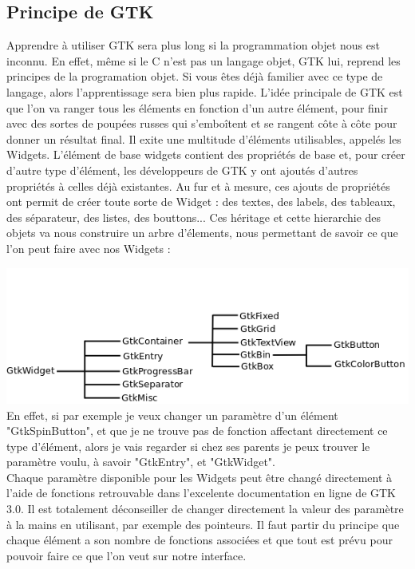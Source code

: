 \documentclass[11pt,french,a4paper]{report}
\begin{document}
        \subsection{Principe de GTK}
Apprendre à utiliser GTK sera plus long si la programmation objet nous est inconnu. En effet, même si le C n'est pas un langage objet, GTK lui, reprend 
les principes de la programation objet. Si vous êtes déjà familier avec ce type de langage, alors l'apprentissage sera bien plus rapide.  
L'idée principale de GTK est que l'on va ranger tous les éléments en fonction d'un autre élément, pour finir avec des sortes de poupées russes qui s'emboîtent 
et se rangent côte à côte pour donner un résultat final. Il exite une multitude d'éléments utilisables, appelés les Widgets. L'élément de base widgets contient des propriétés de 
base et, pour créer d'autre type d'élément, les développeurs de GTK y ont ajoutés d'autres propriétés à celles déjà existantes. 
Au fur et à mesure, ces ajouts de propriétés ont permit de créer toute sorte de Widget : des textes, des labels, des tableaux, des séparateur, des listes, des bouttons... 
Ces héritage et cette hierarchie des objets va nous construire un arbre d'élements, nous permettant de savoir ce que l'on peut faire avec nos Widgets : 

\includegraphics[scale=0.7]{../images/dia/arbo_widget.png} \\


En effet, si par exemple je veux changer un paramètre d'un élément "GtkSpinButton", et que je ne trouve pas de fonction affectant directement ce type d'élément, 
alors je vais regarder si chez ses parents je peux trouver le paramètre voulu, à savoir "GtkEntry", et "GtkWidget". \\

Chaque paramètre disponible pour les Widgets peut être changé directement à l'aide de fonctions retrouvable dans l'excelente documentation en ligne de GTK 3.0. 
Il est totalement déconseiller de changer directement la valeur des paramètre à la mains en utilisant, par exemple des pointeurs. Il faut partir du principe que 
chaque élément a son nombre de fonctions associées et que tout est prévu pour pouvoir faire ce que l'on veut sur notre interface. \\ 
\\
\end{document}
